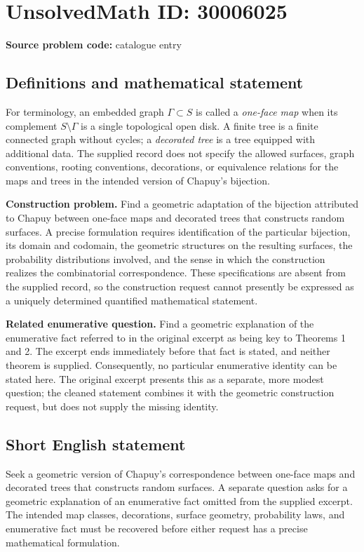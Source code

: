 \documentclass[11pt]{article}
\begin{document}
\section*{UnsolvedMath ID: 30006025}
\textbf{Source problem code:} catalogue entry
\subsection{Definitions and mathematical statement}
For terminology, an embedded graph \(\Gamma\subset S\) is called a \emph{one-face map} when its complement \(S\setminus\Gamma\) is a single topological open disk. A finite tree is a finite connected graph without cycles; a \emph{decorated tree} is a tree equipped with additional data. The supplied record does not specify the allowed surfaces, graph conventions, rooting conventions, decorations, or equivalence relations for the maps and trees in the intended version of Chapuy's bijection.

\textbf{Construction problem.} Find a geometric adaptation of the bijection attributed to Chapuy between one-face maps and decorated trees that constructs random surfaces. A precise formulation requires identification of the particular bijection, its domain and codomain, the geometric structures on the resulting surfaces, the probability distributions involved, and the sense in which the construction realizes the combinatorial correspondence. These specifications are absent from the supplied record, so the construction request cannot presently be expressed as a uniquely determined quantified mathematical statement.

\textbf{Related enumerative question.} Find a geometric explanation of the enumerative fact referred to in the original excerpt as being key to Theorems 1 and 2. The excerpt ends immediately before that fact is stated, and neither theorem is supplied. Consequently, no particular enumerative identity can be stated here. The original excerpt presents this as a separate, more modest question; the cleaned statement combines it with the geometric construction request, but does not supply the missing identity.
\subsection{Short English statement}
Seek a geometric version of Chapuy's correspondence between one-face maps and decorated trees that constructs random surfaces. A separate question asks for a geometric explanation of an enumerative fact omitted from the supplied excerpt. The intended map classes, decorations, surface geometry, probability laws, and enumerative fact must be recovered before either request has a precise mathematical formulation.
\end{document}

